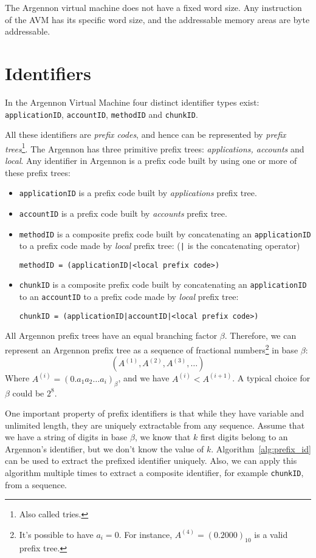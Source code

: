 The Argennon virtual machine does not have a fixed word size. Any instruction of the AVM has
its specific word size, and the addressable memory areas are byte addressable.


\section{Identifiers}\label{sec:identifiers}

In the Argennon Virtual Machine four distinct identifier types exist: \texttt{applicationID}, \texttt{accountID},
\texttt{methodID} and \texttt{chunkID}.

All these identifiers are \emph{prefix codes}, and hence can be represented by
\emph{prefix trees}\footnote{Also called tries.}. The Argennon has three primitive prefix trees:
\emph{applications, accounts} and \emph{local}. Any identifier in Argennon is a
prefix code built by using one or more of these prefix trees:
\begin{itemize}
    \item \texttt{applicationID} is a prefix code built by \emph{applications} prefix tree.
    \item \texttt{accountID} is a prefix code built by \emph{accounts} prefix tree.
    \item \texttt{methodID} is a composite prefix code built by concatenating an \texttt{applicationID} to
    a prefix code made by \emph{local} prefix tree: (\texttt{|} is the concatenating operator)

    \texttt{methodID = (applicationID|<local prefix code>)}
    \item \texttt{chunkID} is a composite prefix code built by concatenating an \texttt{applicationID} to
    an \texttt{accountID} to a prefix code made by \emph{local} prefix tree:

    \texttt{chunkID = (applicationID|accountID|<local prefix code>)}
\end{itemize}

All Argennon prefix trees have an equal branching factor \(\beta\). Therefore, we can represent an Argennon
prefix tree as a sequence of fractional numbers\footnote{It's possible to have \(a_i=0\). For
instance, \(A^{(4)}=(0.2000)_{10}\) is a valid prefix tree.} in base \(\beta\):
\[
    (A^{(1)},A^{(2)},A^{(3)},\dots)
\]
Where \(A^{(i)}=(0.a_{1}a_{2}\dots a_{i})_\beta\), and we have \(A^{(i)}<A^{(i+1)}\). A typical choice for \(\beta\)
could be \(2^8\).

One important property of prefix identifiers is that while they have variable and unlimited length, they are
uniquely extractable from any sequence. Assume that we have a string of digits in base $\beta$, we
know that $k$ first digits belong to an Argennon's identifier, but we don't know the value of $k$.
Algorithm~\ref{alg:prefix_id} can be used to extract the prefixed identifier uniquely. Also, we can apply this algorithm
multiple times to extract a composite identifier, for example \texttt{chunkID}, from a sequence.


